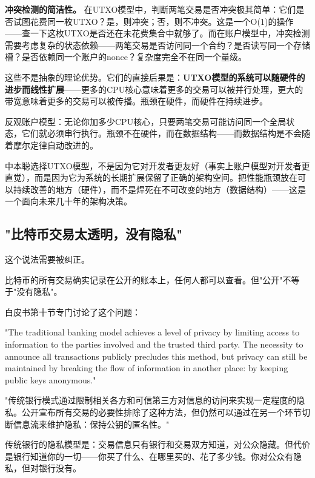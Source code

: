 \documentclass[a4paper,12pt,openany]{ctexbook}
\newenvironment{quoting}{%
  \par\vspace{0.5em}%
  \begin{list}{}{%
    \setlength{\leftmargin}{2em}%
    \setlength{\rightmargin}{2em}%
    \setlength{\parsep}{0.3em}%
    \setlength{\itemsep}{0pt}%
    \setlength{\topsep}{0pt}%
  }%
  \item\relax
}{%
  \end{list}%
  \par\vspace{0.5em}%
}
\begin{document}
\textbf{冲突检测的简洁性。} 在UTXO模型中，判断两笔交易是否冲突极其简单：它们是否试图花费同一枚UTXO？是，则冲突；否，则不冲突。这是一个O(1)的操作——查一下这枚UTXO是否还在未花费集合中就够了。而在账户模型中，冲突检测需要考虑复杂的状态依赖——两笔交易是否访问同一个合约？是否读写同一个存储槽？是否依赖同一个账户的nonce？复杂度完全不在同一个量级。

这些不是抽象的理论优势。它们的直接后果是：\textbf{UTXO模型的系统可以随硬件的进步而线性扩展}——更多的CPU核心意味着更多的交易可以被并行处理，更大的带宽意味着更多的交易可以被传播。瓶颈在硬件，而硬件在持续进步。

反观账户模型：无论你加多少CPU核心，只要两笔交易可能访问同一个全局状态，它们就必须串行执行。瓶颈不在硬件，而在数据结构——而数据结构是不会随着摩尔定律自动改进的。

中本聪选择UTXO模型，不是因为它对开发者更友好（事实上账户模型对开发者更直觉），而是因为它为系统的长期扩展保留了正确的架构空间。把性能瓶颈放在可以持续改善的地方（硬件），而不是焊死在不可改变的地方（数据结构）——这是一个面向未来几十年的架构决策。


\subsection*{"比特币交易太透明，没有隐私"}


这个说法需要被纠正。

比特币的所有交易确实记录在公开的账本上，任何人都可以查看。但"公开"不等于"没有隐私"。

白皮书第十节专门讨论了这个问题：


\begin{quoting}
\small
"The traditional banking model achieves a level of privacy by limiting access to information to the parties involved and the trusted third party. The necessity to announce all transactions publicly precludes this method, but privacy can still be maintained by breaking the flow of information in another place: by keeping public keys anonymous."

"传统银行模式通过限制相关各方和可信第三方对信息的访问来实现一定程度的隐私。公开宣布所有交易的必要性排除了这种方法，但仍然可以通过在另一个环节切断信息流来维护隐私：保持公钥的匿名性。"
\end{quoting}


传统银行的隐私模型是：交易信息只有银行和交易双方知道，对公众隐藏。但代价是银行知道你的一切——你买了什么、在哪里买的、花了多少钱。你对公众有隐私，但对银行没有。
\end{document}

